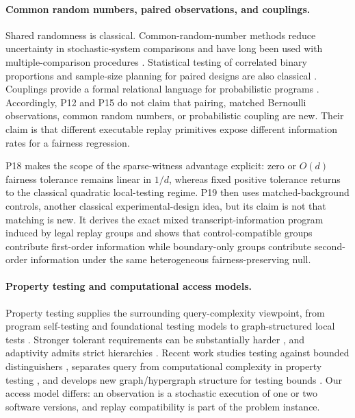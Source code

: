 \paragraph{Common random numbers, paired observations, and couplings.}
Shared randomness is classical.  Common-random-number methods reduce uncertainty
in stochastic-system comparisons and have long been used with
multiple-comparison procedures
\cite{YangNelson1991,GlassermanYao1992,NelsonHsu1993,NelsonMatejcik1995}.  Statistical testing
of correlated binary proportions and sample-size planning for paired designs
are also classical \cite{McNemar1947,Connor1987}.  Couplings provide a formal
relational language for probabilistic programs \cite{BartheEtAl2017}.
Accordingly, P12 and P15 do not claim that pairing, matched Bernoulli
observations, common random numbers, or probabilistic coupling are new.  Their
claim is that different executable replay primitives expose different
information rates for a fairness regression.

P18 makes the scope of the sparse-witness advantage explicit: zero or
$O(d)$ fairness tolerance remains linear in $1/d$, whereas fixed positive
tolerance returns to the classical quadratic local-testing regime.  P19 then
uses matched-background controls, another classical experimental-design idea,
but its claim is not that matching is new.  It derives the exact mixed
transcript-information program induced by legal replay groups and shows that
control-compatible groups contribute first-order information while
boundary-only groups contribute second-order information under the same
heterogeneous fairness-preserving null.

\paragraph{Property testing and computational access models.}
Property testing supplies the surrounding query-complexity viewpoint, from
program self-testing \cite{RubinfeldSudan1996} and foundational testing models
\cite{GoldreichGoldwasserRon1998,GoldreichRon1997} to graph-structured local
tests \cite{ChakrabartySeshadhri2013}.  Stronger tolerant requirements can be
substantially harder \cite{FischerFortnow2006}, and adaptivity admits strict
hierarchies \cite{CanonneGur2018}.  Recent work studies testing against bounded
distinguishers \cite{BunDesaiPinto2026}, separates query from computational
complexity in property testing \cite{PintoPalitRaskhodnikova2026}, and develops
new graph/hypergraph structure for testing bounds \cite{BlaisSeth2024}.  Our
access model differs: an observation is a stochastic execution of one or two
software versions, and replay compatibility is part of the problem instance.


